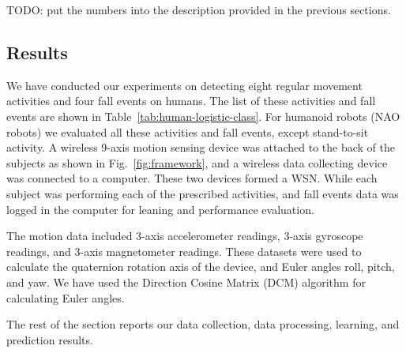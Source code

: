 \documentclass{IEEEtran}
\begin{document}
TODO: put the numbers into the description provided in the previous sections. 

\subsection{Results}


We have conducted our experiments on detecting eight regular movement activities and four fall events on 
humans. The list of these activities and fall events are shown in Table~\ref{tab:human-logistic-class}. For humanoid robots (NAO robots) we evaluated all these activities and fall events, except stand-to-sit activity. 
 A wireless 9-axis  motion sensing device was attached to the back of the subjects as shown in Fig.~\ref{fig:framework}, and a wireless data collecting device was connected to a computer. These two devices formed a WSN. While each subject was performing each of the prescribed activities, and fall events data was logged in the computer for leaning and performance evaluation.
\par
The motion data included 3-axis accelerometer readings, 3-axis gyroscope readings, and 3-axis magnetometer readings. These datasets were used to calculate
the quaternion rotation axis of the device, and Euler angles roll, pitch, and yaw. We have used the Direction Cosine Matrix (DCM) algorithm for calculating Euler angles. 
\par
The rest of the  section reports our data collection, data processing, learning, 
and prediction results.


\end{document}
